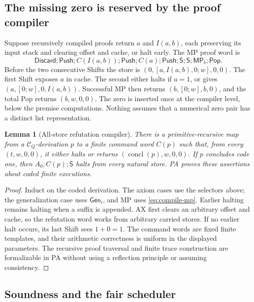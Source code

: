 \documentclass[10pt,letterpaper]{article}
\newtheorem{lemma}[theorem]{Lemma}
\newcommand{\MP}{\mathsf{MP}}
\newcommand{\Sh}{\mathsf S}
\newcommand{\Pop}{\mathsf{Pop}}
\newcommand{\Push}{\mathsf{Push}}
\newcommand{\Discard}{\mathsf{Discard}}
\newcommand{\Gen}{\mathsf{Gen}}
\newcommand{\CQ}{\mathcal C_Q}
\begin{document}
\subsection{The missing zero is reserved by the proof compiler}

Suppose recursively compiled proofs return \(a\) and \(I(a,b)\), each
preserving its input stack and clearing offset and cache, or halt early.
The MP proof word is
\begin{equation}\label{eq:compile-mp}
 \Discard;\Push;C(I(a,b));\Push;C(a);\Push;
                         \Sh;\Sh;\MP_b;\Pop.
\end{equation}
Before the two consecutive Shifts the store is
\((0,[a,I(a,b),0;w],0,0)\). The first Shift exposes \(a\) in cache.
The second either halts if \(a=1\), or gives
\((a,[0;w],0,I(a,b))\). Successful MP then returns
\((b,[0;w],b,0)\), and the total Pop returns \((b,w,0,0)\).
The zero is inserted once at the compiler level, below the premise
computations. Nothing assumes that a numerical zero pair has a distinct
list representation.

\begin{lemma}[All-store refutation compiler]\label{lem:compiler}
There is a primitive-recursive map from a \(\CQ\)-derivation \(p\) to a
finite command word \(C(p)\) such that, from every \((t,w,0,0)\), it either
halts or returns \((\operatorname{concl}(p),w,0,0)\). If \(p\) concludes
code one, then \(A_0;C(p);\Sh\) halts from every natural store.
PA proves these assertions about coded finite executions.
\end{lemma}
\begin{proof}
Induct on the coded derivation. The axiom cases use the selectors above;
the generalization case uses \(\Gen_i\), and MP uses
\eqref{eq:compile-mp}. Earlier halting remains halting when a suffix is
appended. AX first clears an arbitrary offset and cache, so the refutation
word works from arbitrary carried stores. If no earlier halt occurs, its
last Shift sees \(1+0=1\). The command words are fixed finite templates,
and their arithmetic correctness is uniform in the displayed parameters.
The recursive proof traversal and finite trace construction are formalizable
in PA without using a reflection principle or assuming consistency.
\end{proof}

\subsection{Soundness and the fair scheduler}
\end{document}

